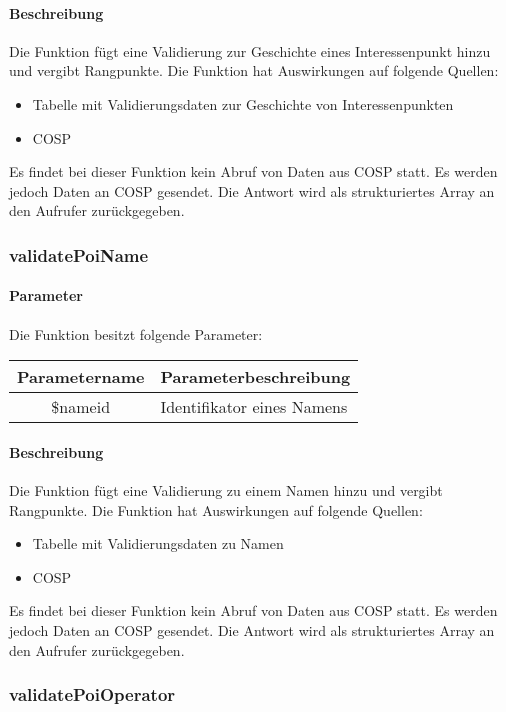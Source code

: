 \paragraph{Beschreibung} Die Funktion fügt eine Validierung zur Geschichte eines Interessenpunkt hinzu und vergibt Rangpunkte. Die Funktion hat Auswirkungen auf folgende Quellen:
\begin{itemize}
	\item Tabelle mit Validierungsdaten zur Geschichte von Interessenpunkten
	\item COSP
\end{itemize}
Es findet bei dieser Funktion kein Abruf von Daten aus {\glqq COSP\grqq} statt. Es werden jedoch Daten an {\glqq COSP\grqq} gesendet. Die Antwort wird als strukturiertes Array an den Aufrufer zurückgegeben.
\subsubsection{validatePoiName}
\paragraph{Parameter} Die Funktion besitzt folgende Parameter:
\begin{table}[H]
	\begin{tabular}{|c|p{11cm}|}
		\hline
		\textbf{Parametername} & \textbf{Parameterbeschreibung} \\ \hline
		\$nameid & Identifikator eines Namens \\ \hline
	\end{tabular}
\end{table}
\paragraph{Beschreibung} Die Funktion fügt eine Validierung zu einem Namen hinzu und vergibt Rangpunkte. Die Funktion hat Auswirkungen auf folgende Quellen:
\begin{itemize}
	\item Tabelle mit Validierungsdaten zu Namen
	\item COSP
\end{itemize}
Es findet bei dieser Funktion kein Abruf von Daten aus {\glqq COSP\grqq} statt. Es werden jedoch Daten an {\glqq COSP\grqq} gesendet. Die Antwort wird als strukturiertes Array an den Aufrufer zurückgegeben.
\subsubsection{validatePoiOperator}
